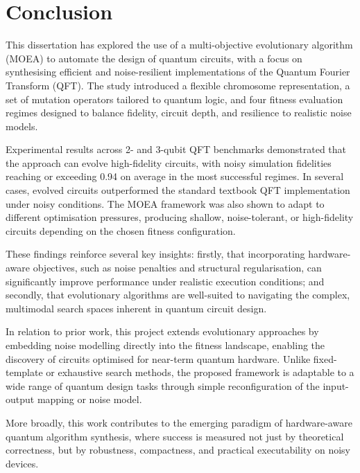 \documentclass[11pt,a4paper]{article}
\begin{document}
%
%
\section{Conclusion}\label{sec:conclusion}
This dissertation has explored the use of a multi-objective evolutionary algorithm (MOEA) to automate the design of quantum circuits, with a focus on synthesising efficient and noise-resilient implementations of the Quantum Fourier Transform (QFT). The study introduced a flexible chromosome representation, a set of mutation operators tailored to quantum logic, and four fitness evaluation regimes designed to balance fidelity, circuit depth, and resilience to realistic noise models.\newline

Experimental results across 2- and 3-qubit QFT benchmarks demonstrated that the approach can evolve high-fidelity circuits, with noisy simulation fidelities reaching or exceeding 0.94 on average in the most successful regimes. In several cases, evolved circuits outperformed the standard textbook QFT implementation under noisy conditions. The MOEA framework was also shown to adapt to different optimisation pressures, producing shallow, noise-tolerant, or high-fidelity circuits depending on the chosen fitness configuration.\newline

These findings reinforce several key insights: firstly, that incorporating hardware-aware objectives, such as noise penalties and structural regularisation, can significantly improve performance under realistic execution conditions; and secondly, that evolutionary algorithms are well-suited to navigating the complex, multimodal search spaces inherent in quantum circuit design.\newline

In relation to prior work, this project extends evolutionary approaches by embedding noise modelling directly into the fitness landscape, enabling the discovery of circuits optimised for near-term quantum hardware. Unlike fixed-template or exhaustive search methods, the proposed framework is adaptable to a wide range of quantum design tasks through simple reconfiguration of the input-output mapping or noise model.\newline

More broadly, this work contributes to the emerging paradigm of hardware-aware quantum algorithm synthesis, where success is measured not just by theoretical correctness, but by robustness, compactness, and practical executability on noisy devices.\newline
\end{document}
